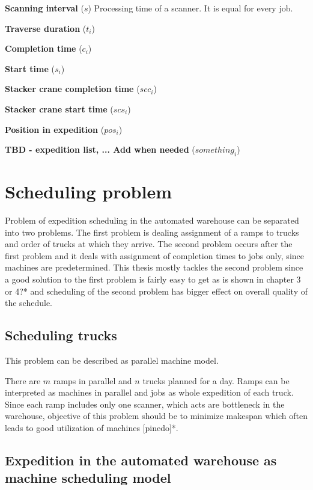 \documentclass{ctuthesis}
\begin{document}
\noindent \textbf{Scanning interval} ($s$) Processing time of a scanner. It is equal for every job.

\noindent \textbf{Traverse duration} ($t_i$)

\noindent \textbf{Completion time} ($c_i$)

\noindent \textbf{Start time} ($s_i$)

\noindent \textbf{Stacker crane completion time} ($scc_i$)

\noindent \textbf{Stacker crane start time} ($scs_i$)

\noindent \textbf{Position in expedition} ($pos_i$)

\noindent \textbf{TBD - expedition list, ... Add when needed} ($something_i$)


\section{Scheduling problem}
 
 Problem of expedition scheduling in the automated warehouse can be separated into two problems. The first problem is dealing assignment of a ramps to trucks and order of trucks at which they arrive. The second problem occurs after the first problem and it deals with assignment of completion times to jobs only, since machines are predetermined. This thesis mostly tackles the second problem since a good solution to the first problem is fairly easy to get as is shown in chapter 3 or 4?* and scheduling of the second problem has bigger effect on overall quality of the schedule.
 
 \subsection{Scheduling trucks}
 
 This problem can be described as parallel machine model.
 
 There are $m$ ramps in parallel and $n$ trucks planned for a day. Ramps can be interpreted as machines in parallel and jobs as whole expedition of each truck. Since each ramp includes only one scanner, which acts are bottleneck in the warehouse, objective of this problem should be to minimize makespan which often leads to good utilization of machines [pinedo]*.
 
\subsection{Expedition in the automated warehouse as machine scheduling model}
\end{document}
